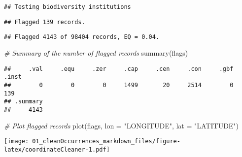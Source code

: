 \documentclass[
]{article}
\newenvironment{Shaded}{\begin{snugshade}}{\end{snugshade}}
\newcommand{\AttributeTok}[1]{\textcolor[rgb]{0.77,0.63,0.00}{#1}}
\newcommand{\CommentTok}[1]{\textcolor[rgb]{0.56,0.35,0.01}{\textit{#1}}}
\newcommand{\ConstantTok}[1]{\textcolor[rgb]{0.00,0.00,0.00}{#1}}
\newcommand{\FunctionTok}[1]{\textcolor[rgb]{0.00,0.00,0.00}{#1}}
\newcommand{\NormalTok}[1]{#1}
\newcommand{\OtherTok}[1]{\textcolor[rgb]{0.56,0.35,0.01}{#1}}
\newcommand{\SpecialCharTok}[1]{\textcolor[rgb]{0.00,0.00,0.00}{#1}}
\newcommand{\StringTok}[1]{\textcolor[rgb]{0.31,0.60,0.02}{#1}}
\begin{document}
\begin{verbatim}
## Testing biodiversity institutions
\end{verbatim}

\begin{verbatim}
## Flagged 139 records.
\end{verbatim}

\begin{verbatim}
## Flagged 4143 of 98404 records, EQ = 0.04.
\end{verbatim}

\begin{Shaded}
\begin{Highlighting}[]
\CommentTok{\# Summary of the number of flagged records}
\FunctionTok{summary}\NormalTok{(flags)}
\end{Highlighting}
\end{Shaded}

\begin{verbatim}
##     .val     .equ     .zer     .cap     .cen     .con     .gbf    .inst 
##        0        0        0     1499       20     2514        0      139 
## .summary 
##     4143
\end{verbatim}

\begin{Shaded}
\begin{Highlighting}[]
\CommentTok{\# Plot flagged records}
\FunctionTok{plot}\NormalTok{(flags, }\AttributeTok{lon =} \StringTok{"LONGITUDE"}\NormalTok{, }\AttributeTok{lat =} \StringTok{"LATITUDE"}\NormalTok{)}
\end{Highlighting}
\end{Shaded}

\texttt{[image: 01\_cleanOccurrences\_markdown\_files/figure-latex/coordinateCleaner-1.pdf]}

\begin{Shaded}
\end{Shaded}
\end{document}
